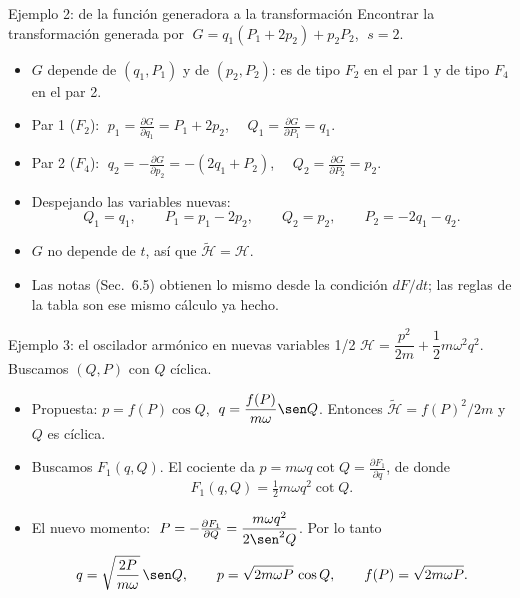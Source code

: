 \documentclass[spanish]{beamer}
\newcommand{\Ham}{\mathcal{H}}               %
\newcommand{\tH}{\tilde{\mathcal{H}}}        %
\newcommand{\pd}[2]{\frac{\partial #1}{\partial #2}}
\begin{document}
\begin{frame}{Ejemplo 2: de la función generadora a la transformación}
Encontrar la transformación generada por
$\;G=q_1(P_1+2p_2)+p_2P_2$, $\;s=2$.
\begin{itemize}[<+->]
  \item $G$ depende de $(q_1,P_1)$ y de $(p_2,P_2)$: es de tipo $F_2$ en el par 1 y de
        tipo $F_4$ en el par 2.
  \item Par 1 ($F_2$):
        $\;p_1=\pd{G}{q_1}=P_1+2p_2$, $\quad Q_1=\pd{G}{P_1}=q_1$.
  \item Par 2 ($F_4$):
        $\;q_2=-\pd{G}{p_2}=-(2q_1+P_2)$, $\quad Q_2=\pd{G}{P_2}=p_2$.
  \item Despejando las variables nuevas:
        \[
          Q_1=q_1,\qquad P_1=p_1-2p_2,\qquad Q_2=p_2,\qquad P_2=-2q_1-q_2 .
        \]
  \item $G$ no depende de $t$, así que $\tH=\Ham$.
  \item Las notas (Sec.~6.5) obtienen lo mismo desde la condición $dF/dt$; las reglas
        de la tabla son ese mismo cálculo ya hecho.
\end{itemize}
\end{frame}

\begin{frame}{Ejemplo 3: el oscilador armónico en nuevas variables 1/2}
$\Ham=\dfrac{p^2}{2m}+\dfrac12 m\omega^2q^2$. Buscamos $(Q,P)$ con $Q$ cíclica.
\begin{itemize}[<+->]
  \item Propuesta: $p=f(P)\cos Q$, $\;q=\dfrac{f(P)}{m\omega}\sen Q$. Entonces
        $\tH=f(P)^2/2m$ y $Q$ es cíclica.
  \item Buscamos $F_1(q,Q)$. El cociente da $p=m\omega q\cot Q=\pd{F_1}{q}$, de donde
        \[
          F_1(q,Q)=\tfrac12 m\omega q^2\cot Q .
        \]
  \item El nuevo momento:
        $\;P=-\pd{F_1}{Q}=\dfrac{m\omega q^2}{2\sen^2 Q}$. Por lo tanto
        \[
          q=\sqrt{\frac{2P}{m\omega}}\,\sen Q,\qquad p=\sqrt{2m\omega P}\,\cos Q,
          \qquad f(P)=\sqrt{2m\omega P}.
        \]
\end{itemize}
\end{frame}
\end{document}
